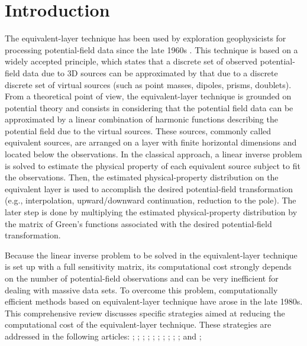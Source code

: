 \documentclass[utf8]{FrontiersinHarvard} %
\begin{document}
	\section{Introduction}
	
	The equivalent-layer technique has been used by exploration geophysicists for processing potential-field 
	data since the late 1960s \citep{dampney1969}. 
	This technique is based on a widely accepted principle, which states that a discrete set of observed 
	potential-field data due to 3D sources 
	can be approximated by that due to a discrete discrete set of virtual sources (such as point 
	masses, dipoles, prisms, doublets). From a theoretical point of view, the equivalent-layer 
	technique is grounded on potential theory \citep{kellogg1967} and consists in considering 
	that the potential field data can be approximated by a linear combination of harmonic 
	functions describing the potential field due to the virtual sources. These sources, commonly 
	called equivalent sources, are arranged on a layer with finite horizontal dimensions and 
	located below the observations. In the classical approach, a linear inverse problem is 
	solved to estimate the physical property of each equivalent source subject to fit the 
	observations. Then, the estimated physical-property distribution on the equivalent layer is 
	used to accomplish the desired potential-field transformation (e.g., interpolation, 
	upward/downward continuation, reduction to the pole). The later step is done by multiplying 
	the estimated physical-property distribution by the matrix of Green's functions associated 
	with the desired potential-field transformation.
	
	Because the linear inverse problem to be solved in the equivalent-layer technique is set up 
	with a full sensitivity matrix, its computational cost strongly depends on the number of 
	potential-field observations and can be very inefficient for dealing with massive data sets. 
	To overcome this problem, computationally efficient methods based on equivalent-layer 
	technique have arose in the late 1980s. 
	This comprehensive review discusses specific strategies aimed at reducing the computational cost of the equivalent-layer technique.
	These strategies are addressed in the following articles: 
	\cite{leao-silva1989};
	\cite{cordell1992};
	\cite{xia-etal1993};
	\cite{mendonca-silva1994};  
	\cite{guspi-novara2009};
	\cite{li-oldenburg2010};
	\cite{oliveirajr-etal2013};
	\cite{siqueira-etal2017};
	\cite{jirigalatu-ebbing2019};
	\citet{takahashi-etal2020,takahashi-etal2022}
	\cite{mendonca2020}; and
	\cite{soler-uieda2021};
	
\end{document}
